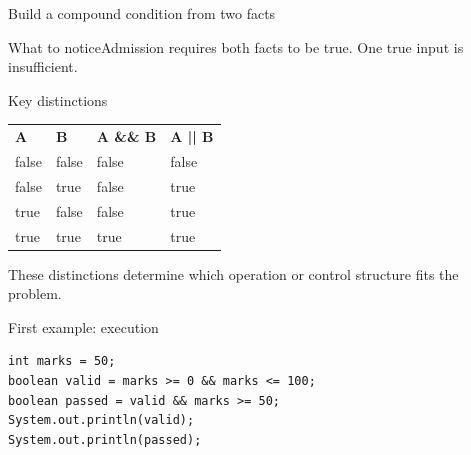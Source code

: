 \documentclass[10pt,aspectratio=169]{beamer}
\begin{document}
\begin{frame}[fragile,t]{Build a compound condition from two facts}
\begin{center}\end{center}
\begin{block}{What to notice}Admission requires both facts to be true. One true input is insufficient.\end{block}
\end{frame}
\begin{frame}[fragile,t]{Key distinctions}
\small\renewcommand{\arraystretch}{1.5}
\begin{tabularx}{\textwidth}{>{\raggedright\arraybackslash}X>{\raggedright\arraybackslash}X>{\raggedright\arraybackslash}X>{\raggedright\arraybackslash}X}
\rowcolor{navy}
\color{white}\bfseries A & \color{white}\bfseries B & \color{white}\bfseries A \&\& B & \color{white}\bfseries A || B\\
false & false & false & false\\
false & true & false & true\\
true & false & false & true\\
true & true & true & true\\
\end{tabularx}
\vspace{3mm}\footnotesize These distinctions determine which operation or control structure fits the problem.
\end{frame}

\begin{frame}[fragile,t]{First example: execution}
\begin{lstlisting}
int marks = 50;
boolean valid = marks >= 0 && marks <= 100;
boolean passed = valid && marks >= 50;
System.out.println(valid);
System.out.println(passed);
\end{lstlisting}
\end{frame}
\end{document}
